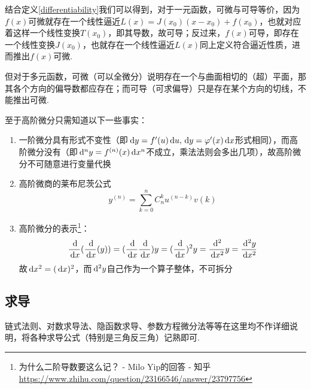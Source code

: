 \par 结合定义\ref{differentiability}我们可以得到，对于一元函数，可微与可导等价，因为$f(x)$可微就存在一个线性逼近$L(x)=J(x_0)(x-x_0)+f(x_0)$，也就对应着这样一个线性变换$T(x_0)$，即其导数，故可导；反过来，$f(x)$可导，即存在一个线性变换$J(x_0)$，也就存在一个线性逼近$L(x)$同上定义符合逼近性质，进而推出$f(x)$可微.
\par 但对于多元函数，可微（可以全微分）说明存在一个与曲面相切的（超）平面，那其各个方向的偏导数都应存在；而可导（可求偏导）只是存在某个方向的切线，不能推出可微.
\par 至于高阶微分只需知道以下一些事实：
\begin{enumerate}
	\itemsep -3pt
	\item 一阶微分具有形式不变性（即$\,\mathrm{d} y=f'(u)\,\mathrm{d} u,\,\mathrm{d} y=\varphi'(x)\,\mathrm{d} x$形式相同），而高阶微分没有（即$\,\mathrm{d}^ny=f^{(n)}(x)\,\mathrm{d} x^n$不成立，乘法法则会多出几项），故高阶微分不可随意进行变量代换
	\item 高阶微商的莱布尼茨公式
	\[y^{(n)}=\sum_{k=0}^nC_n^ku^{(n-k)}v{(k)}\]
	\item 高阶微分的表示\footnote{为什么二阶导数要这么记？ - Milo Yip的回答 - 知乎 \url{https://www.zhihu.com/question/23166546/answer/23797756}}：
	\[\dfrac{\,\mathrm{d} }{\,\mathrm{d} x}(\dfrac{\,\mathrm{d} }{\,\mathrm{d} x}(y))=(\dfrac{\,\mathrm{d} }{\,\mathrm{d} x}\dfrac{\,\mathrm{d} }{\,\mathrm{d} x})y=(\dfrac{\,\mathrm{d} }{\,\mathrm{d} x})^2y=\dfrac{\,\mathrm{d}^2 }{\,\mathrm{d} x^2} y=\dfrac{\,\mathrm{d}^2 y}{\,\mathrm{d} x^2}\]
	故$\,\mathrm{d} x^2=(\,\mathrm{d} x)^2$，而$\,\mathrm{d}^2 y$自己作为一个算子整体，不可拆分
\end{enumerate}

\subsection{求导}
链式法则、对数求导法、隐函数求导、参数方程微分法等等在这里均不作详细说明，将各种求导公式（特别是三角反三角）记熟即可.

